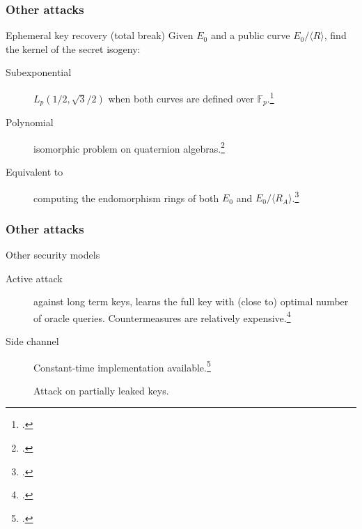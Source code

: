 \documentclass{beamer}
\newcommand{\F}{\mathbb{F}}
\newcommand{\cyc}[1]{{\langle #1 \rangle}}
\begin{document}

\begin{frame}
  \frametitle{Other attacks}

  \begin{block}{Ephemeral key recovery (total break)}
    Given $E_0$ and a public curve $E_0/\cyc{R}$, find
    the kernel of the secret isogeny:
    \begin{description}
    \item[Subexponential] $L_p(1/2, \sqrt{3}/2)$ 
      when both curves are defined over $\F_p$.\footcite{biasse2014quantum}
    \item[Polynomial] isomorphic problem
      on quaternion algebras.\footcite{kohel2014quaternion}
    \item[Equivalent to] computing the endomorphism rings of both $E_0$
      and $E_0/\cyc{R_A}$.\footcite{galbraithsecurity}
    \end{description}
  \end{block}
\end{frame}


\begin{frame}
  \frametitle{Other attacks}

  \begin{block}{Other security models}
    \renewcommand{\thefootnote}{\alph{footnote}}
    \begin{description}
    \item[Active attack] against long term keys, learns the full key
      with (close to) optimal number of oracle
      queries. Countermeasures are relatively
      expensive.\footcite{galbraithsecurity}
    \item[Side channel] Constant-time implementation
      available.\footcite{costello2015four}
    \item[] Attack on partially leaked
      keys.\footnotemark[1]
    \end{description}
  \end{block}


\end{frame}

\end{document}
